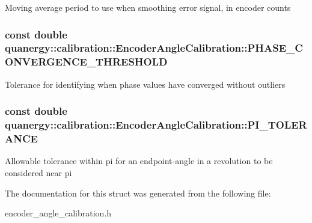 Moving average period to use when smoothing error signal, in encoder counts \hypertarget{structquanergy_1_1calibration_1_1EncoderAngleCalibration_a12436409c1f1f10f4c005e45fcfbfbf2}{
\subsubsection[{P\-H\-A\-S\-E\-\_\-\-C\-O\-N\-V\-E\-R\-G\-E\-N\-C\-E\-\_\-\-T\-H\-R\-E\-S\-H\-O\-L\-D}]{\setlength{\rightskip}{0pt plus 5cm}const double quanergy\-::calibration\-::\-Encoder\-Angle\-Calibration\-::\-P\-H\-A\-S\-E\-\_\-\-C\-O\-N\-V\-E\-R\-G\-E\-N\-C\-E\-\_\-\-T\-H\-R\-E\-S\-H\-O\-L\-D\hspace{0.3cm}{\ttfamily [static]}}}\label{structquanergy_1_1calibration_1_1EncoderAngleCalibration_a12436409c1f1f10f4c005e45fcfbfbf2}
Tolerance for identifying when phase values have converged without outliers \hypertarget{structquanergy_1_1calibration_1_1EncoderAngleCalibration_a934b8f1f5c14ed61c7ba6bc5e01ddd5b}{
\subsubsection[{P\-I\-\_\-\-T\-O\-L\-E\-R\-A\-N\-C\-E}]{\setlength{\rightskip}{0pt plus 5cm}const double quanergy\-::calibration\-::\-Encoder\-Angle\-Calibration\-::\-P\-I\-\_\-\-T\-O\-L\-E\-R\-A\-N\-C\-E\hspace{0.3cm}{\ttfamily [static]}}}\label{structquanergy_1_1calibration_1_1EncoderAngleCalibration_a934b8f1f5c14ed61c7ba6bc5e01ddd5b}
Allowable tolerance within pi for an endpoint-\/angle in a revolution to be considered near pi 

The documentation for this struct was generated from the following file\-:\begin{DoxyCompactItemize}
\item 
encoder\-\_\-angle\-\_\-calibration.\-h\end{DoxyCompactItemize}
